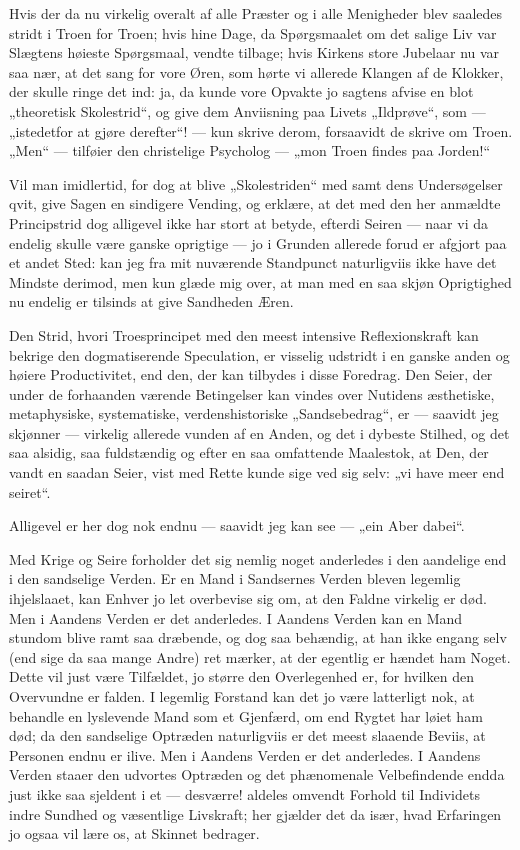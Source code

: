 \documentclass[12pt,a4paper]{book}
\begin{document}
Hvis der da nu virkelig overalt af alle Præster og i alle Menigheder blev
saaledes stridt i Troen for Troen; hvis hine Dage, da Spørgsmaalet om det
salige Liv var Slægtens høieste Spørgsmaal, vendte tilbage; hvis Kirkens store
Jubelaar nu var saa nær, at det sang for vore Øren, som hørte vi allerede
Klangen af de Klokker, der skulle ringe det ind: ja, da kunde vore Opvakte jo
sagtens afvise en blot „theoretisk Skolestrid“, og give dem Anviisning paa
Livets „Ildprøve“, som --- „istedetfor at gjøre derefter“! --- kun skrive
derom, forsaavidt de skrive om Troen. „Men“ --- tilføier den christelige
Psycholog --- „mon Troen findes paa Jorden!“

Vil man imidlertid, for dog at blive „Skolestriden“ med samt dens
Undersøgelser qvit, give Sagen en sindigere Vending, og erklære, at det med den
her anmældte Principstrid dog alligevel ikke har stort at betyde, efterdi
Seiren --- naar vi da endelig skulle være ganske oprigtige --- jo i Grunden
allerede forud er afgjort paa et andet Sted: kan jeg fra mit nuværende
Standpunct naturligviis ikke have det Mindste derimod, men kun glæde mig over,
at man med en saa skjøn Oprigtighed nu endelig er tilsinds at give Sandheden
Æren.

Den Strid, hvori Troesprincipet med den meest intensive Reflexionskraft kan
bekrige den dogmatiserende Speculation, er visselig udstridt i en ganske anden
og høiere Productivitet, end den, der kan tilbydes i disse Foredrag. Den Seier,
der under de forhaanden værende Betingelser kan vindes over Nutidens
æsthetiske, metaphysiske, systematiske, verdenshistoriske „Sandsebedrag“, er
--- saavidt jeg skjønner --- virkelig allerede vunden af en Anden, og det i
dybeste Stilhed, og det saa alsidig, saa fuldstændig og efter en saa omfattende
Maalestok, at Den, der vandt en saadan Seier, vist med Rette kunde sige ved sig
selv: „vi have meer end seiret“.

Alligevel er her dog nok endnu --- saavidt jeg kan see --- „ein Aber dabei“.

Med Krige og Seire forholder det sig nemlig noget anderledes i den aandelige
end i den sandselige Verden. Er en Mand i Sandsernes Verden bleven legemlig
ihjelslaaet, kan Enhver jo let overbevise sig om, at den Faldne virkelig er død.
Men i Aandens Verden er det anderledes. I Aandens Verden kan en Mand stundom
blive ramt saa dræbende, og dog saa behændig, at han ikke engang selv (end sige
da saa mange Andre) ret mærker, at der egentlig er hændet ham Noget. Dette vil
just være Tilfældet, jo større den Overlegenhed er, for hvilken den Overvundne
er falden. I legemlig Forstand kan det jo være latterligt nok, at behandle en
lyslevende Mand som et Gjenfærd, om end Rygtet har løiet ham død; da den
sandselige Optræden naturligviis er det meest slaaende Beviis, at Personen
endnu er ilive. Men i Aandens Verden er det anderledes. I Aandens Verden staaer
den udvortes Optræden og det phænomenale Velbefindende endda just ikke saa
sjeldent i et --- desværre! aldeles omvendt Forhold til Individets indre
Sundhed og væsentlige Livskraft; her gjælder det da især, hvad Erfaringen jo
ogsaa vil lære os, at Skinnet bedrager.
\end{document}
